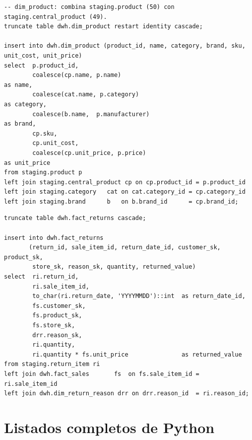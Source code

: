 \begin{lstlisting}[language=SQLpostgres,
  caption={\texttt{30\_load\_dim\_product.sql}: combinación de
  \texttt{product} y \texttt{central\_product}.},
  label={lst:ap-dim-product}]
-- dim_product: combina staging.product (50) con staging.central_product (49).
truncate table dwh.dim_product restart identity cascade;

insert into dwh.dim_product (product_id, name, category, brand, sku, unit_cost, unit_price)
select  p.product_id,
        coalesce(cp.name, p.name)                                         as name,
        coalesce(cat.name, p.category)                                    as category,
        coalesce(b.name,  p.manufacturer)                                 as brand,
        cp.sku,
        cp.unit_cost,
        coalesce(cp.unit_price, p.price)                                  as unit_price
from staging.product p
left join staging.central_product cp on cp.product_id = p.product_id
left join staging.category   cat on cat.category_id = cp.category_id
left join staging.brand      b   on b.brand_id      = cp.brand_id;
\end{lstlisting}

\begin{lstlisting}[language=SQLpostgres,
  caption={\texttt{70\_load\_fact\_returns.sql}: reutilización de FKs de
  \texttt{fact\_sales}.},
  label={lst:ap-fact-returns}]
truncate table dwh.fact_returns cascade;

insert into dwh.fact_returns
       (return_id, sale_item_id, return_date_id, customer_sk, product_sk,
        store_sk, reason_sk, quantity, returned_value)
select  ri.return_id,
        ri.sale_item_id,
        to_char(ri.return_date, 'YYYYMMDD')::int  as return_date_id,
        fs.customer_sk,
        fs.product_sk,
        fs.store_sk,
        drr.reason_sk,
        ri.quantity,
        ri.quantity * fs.unit_price               as returned_value
from staging.return_item ri
left join dwh.fact_sales       fs  on fs.sale_item_id = ri.sale_item_id
left join dwh.dim_return_reason drr on drr.reason_id  = ri.reason_id;
\end{lstlisting}

\section{Listados completos de Python}
\label{ap:python}

